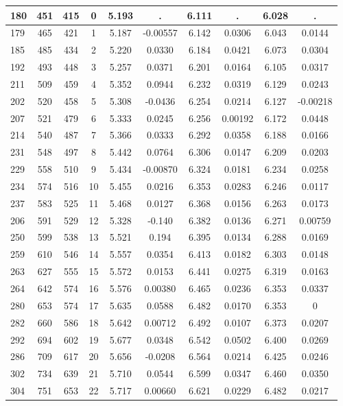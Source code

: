 \documentclass[]{article}
\begin{document}
\begin{tabular}{lccccccccc} \hline
180 & 451 & 415 & 0 & 5.193 & . & 6.111 & . & 6.028 & . \\ \hline
179 & 465 & 421 & 1 & 5.187 & -0.00557 & 6.142 & 0.0306 & 6.043 & 0.0144 \\
185 & 485 & 434 & 2 & 5.220 & 0.0330 & 6.184 & 0.0421 & 6.073 & 0.0304 \\
192 & 493 & 448 & 3 & 5.257 & 0.0371 & 6.201 & 0.0164 & 6.105 & 0.0317 \\
211 & 509 & 459 & 4 & 5.352 & 0.0944 & 6.232 & 0.0319 & 6.129 & 0.0243 \\
202 & 520 & 458 & 5 & 5.308 & -0.0436 & 6.254 & 0.0214 & 6.127 & -0.00218 \\
207 & 521 & 479 & 6 & 5.333 & 0.0245 & 6.256 & 0.00192 & 6.172 & 0.0448 \\
214 & 540 & 487 & 7 & 5.366 & 0.0333 & 6.292 & 0.0358 & 6.188 & 0.0166 \\
231 & 548 & 497 & 8 & 5.442 & 0.0764 & 6.306 & 0.0147 & 6.209 & 0.0203 \\
229 & 558 & 510 & 9 & 5.434 & -0.00870 & 6.324 & 0.0181 & 6.234 & 0.0258 \\
234 & 574 & 516 & 10 & 5.455 & 0.0216 & 6.353 & 0.0283 & 6.246 & 0.0117 \\
237 & 583 & 525 & 11 & 5.468 & 0.0127 & 6.368 & 0.0156 & 6.263 & 0.0173 \\
206 & 591 & 529 & 12 & 5.328 & -0.140 & 6.382 & 0.0136 & 6.271 & 0.00759 \\
250 & 599 & 538 & 13 & 5.521 & 0.194 & 6.395 & 0.0134 & 6.288 & 0.0169 \\
259 & 610 & 546 & 14 & 5.557 & 0.0354 & 6.413 & 0.0182 & 6.303 & 0.0148 \\
263 & 627 & 555 & 15 & 5.572 & 0.0153 & 6.441 & 0.0275 & 6.319 & 0.0163 \\
264 & 642 & 574 & 16 & 5.576 & 0.00380 & 6.465 & 0.0236 & 6.353 & 0.0337 \\
280 & 653 & 574 & 17 & 5.635 & 0.0588 & 6.482 & 0.0170 & 6.353 & 0 \\
282 & 660 & 586 & 18 & 5.642 & 0.00712 & 6.492 & 0.0107 & 6.373 & 0.0207 \\
292 & 694 & 602 & 19 & 5.677 & 0.0348 & 6.542 & 0.0502 & 6.400 & 0.0269 \\
286 & 709 & 617 & 20 & 5.656 & -0.0208 & 6.564 & 0.0214 & 6.425 & 0.0246 \\
302 & 734 & 639 & 21 & 5.710 & 0.0544 & 6.599 & 0.0347 & 6.460 & 0.0350 \\
304 & 751 & 653 & 22 & 5.717 & 0.00660 & 6.621 & 0.0229 & 6.482 & 0.0217 \\

\end{tabular}
\end{document}
